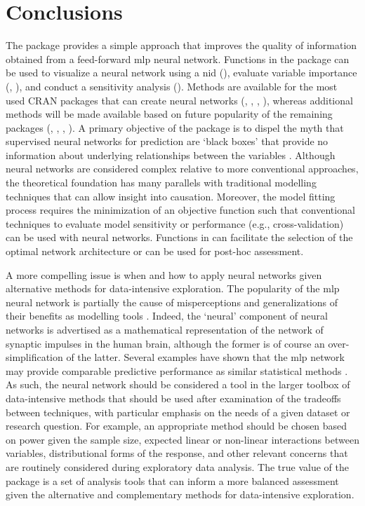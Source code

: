 \documentclass[article,shortnames]{jss}\usepackage[]{graphicx}\usepackage[]{color}
\begin{document}
\section[Conclusions]{Conclusions}

The  package provides a simple approach that improves the quality of information obtained from a feed-forward \ac{mlp} neural network.  Functions in the package can be used to visualize a neural network using a \acl{nid} (), evaluate variable importance (, ), and conduct a sensitivity analysis ().  Methods are available for the most used \ac{CRAN} packages that can create neural networks (, , , ), whereas additional methods will be made available based on future popularity of the remaining packages (, , , ).  A primary objective of the package is to dispel the myth that supervised neural networks for prediction are `black boxes' that provide no information about underlying relationships between the variables \citep{Paruelo97,Olden02}.  Although neural networks are considered complex relative to more conventional approaches, the theoretical foundation has many parallels with traditional modelling techniques that can allow insight into causation.  Moreover, the model fitting process requires the minimization of an objective function such that conventional techniques to evaluate model sensitivity or performance (e.g., cross-validation) can be used with neural networks.  Functions in  can facilitate the selection of the optimal network architecture or can be used for post-hoc assessment. 

A more compelling issue is when and how to apply neural networks given alternative methods for data-intensive exploration.  The popularity of the \ac{mlp} neural network is partially the cause of misperceptions and generalizations of their benefits as modelling tools \citep{Burke97}. Indeed, the `neural' component of neural networks is advertised as a mathematical representation of the network of synaptic impulses in the human brain, although the former is of course an over-simplification of the latter.  Several examples have shown that the \ac{mlp} network may provide comparable predictive performance as similar statistical methods \citep{Feng02,Razi05,Beck14a}.  As such, the neural network should be considered a tool in the larger toolbox of data-intensive methods that should be used after examination of the tradeoffs between techniques, with particular emphasis on the needs of a given dataset or research question.  For example, an appropriate method should be chosen based on power given the sample size, expected linear or non-linear interactions between variables, distributional forms of the response, and other relevant concerns that are routinely considered during exploratory data analysis.  The true value of the  package is a set of analysis tools that can inform a more balanced assessment given the alternative and complementary methods for data-intensive exploration.
\end{document}
